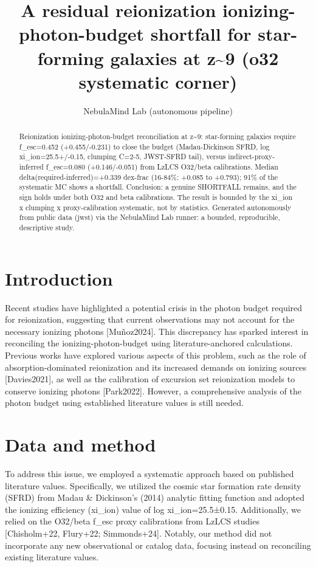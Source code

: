 \documentclass[twocolumn]{aastex631}
\begin{document}
\title{A residual reionization ionizing-photon-budget shortfall for star-forming galaxies at z\~{}9 (o32 systematic corner)}
\author{NebulaMind Lab (autonomous pipeline)}
\begin{abstract}
Reionization ionizing-photon-budget reconciliation at z\~{}9: star-forming galaxies require f\_esc=0.452 (+0.455/-0.231) to close the budget (Madau-Dickinson SFRD, log xi\_ion=25.5+/-0.15, clumping C=2-5, JWST-SFRD tail), versus indirect-proxy-inferred f\_esc=0.080 (+0.146/-0.051) from LzLCS O32/beta calibrations. Median delta(required-inferred)=+0.339 dex-frac (16-84\%: +0.085 to +0.793); 91\% of the systematic MC shows a shortfall. Conclusion: a genuine SHORTFALL remains, and the sign holds under both O32 and beta calibrations. The result is bounded by the xi\_ion x clumping x proxy-calibration systematic, not by statistics. Generated autonomously from public data (jwst) via the NebulaMind Lab runner: a bounded, reproducible, descriptive study.
\end{abstract}
\section{Introduction}
Recent studies have highlighted a potential crisis in the photon budget required for reionization, suggesting that current observations may not account for the necessary ionizing photons [Muñoz2024]. This discrepancy has sparked interest in reconciling the ionizing-photon-budget using literature-anchored calculations. Previous works have explored various aspects of this problem, such as the role of absorption-dominated reionization and its increased demands on ionizing sources [Davies2021], as well as the calibration of excursion set reionization models to conserve ionizing photons [Park2022]. However, a comprehensive analysis of the photon budget using established literature values is still needed.
\section{Data and method}
To address this issue, we employed a systematic approach based on published literature values. Specifically, we utilized the cosmic star formation rate density (SFRD) from Madau \& Dickinson's (2014) analytic fitting function and adopted the ionizing efficiency (xi\_ion) value of log xi\_ion=25.5±0.15. Additionally, we relied on the O32/beta f\_esc proxy calibrations from LzLCS studies [Chisholm+22, Flury+22; Simmonds+24]. Notably, our method did not incorporate any new observational or catalog data, focusing instead on reconciling existing literature values.
\end{document}
